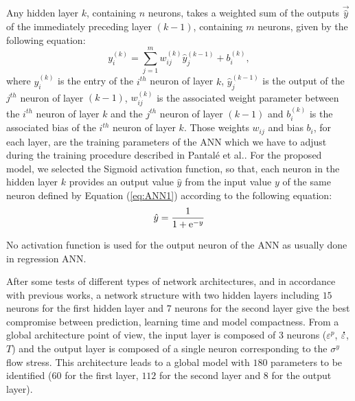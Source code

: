 \documentclass[twoside,english,1p,final,sort&compress]{elsarticle}
\makeatletter
\theoremstyle{plain}
\DeclareRobustCommand{\e}[1]{{\rm e}^{#1}}
\DeclareRobustCommand{\lay}[1]{^{(#1)}}
\DeclareRobustCommand{\mdot}[1]{\accentset{\mbox{\bfseries .}}{#1}}
\DeclareRobustCommand{\eal}{et al.\@\xspace}
\makeatother
\begin{document}
Any hidden layer $k$, containing $n$ neurons, takes a weighted sum of the outputs $\overrightarrow{\hat{y}}$ of the immediately preceding layer $(k-1)$, containing $m$ neurons, given by the following equation:
\begin{equation}
y_i\lay{k} = \sum_{j=1}^m w_{ij}\lay{k} \hat{y}_j^{(k-1)}+ b_i\lay{k},\label{eq:ANN1}
\end{equation}
where $y_i\lay{k}$ is the entry of the $i^{th}$ neuron of layer $k$, $\hat{y}_j\lay{k-1}$ is the output of the $j^{th}$ neuron of layer $(k-1)$, $w_{ij}\lay{k}$ is the associated weight parameter between the $i^{th}$ neuron of layer $k$ and the $j^{th}$ neuron of layer $(k-1)$ and $b_i\lay{k}$ is the associated bias of the $i^{th}$ neuron of layer $k$.
Those weights $w_{ij}$ and bias $b_i$, for each layer, are the training parameters of the ANN which we have to adjust during the training procedure described in Pantalé \eal \cite{Pantale-2021, Pantale-2023}.
For the proposed model, we selected the Sigmoid activation function, so that, each neuron in the hidden layer $k$ provides an output value ${\hat{y}}$ from the input value $y$ of the same neuron defined by Equation (\ref{eq:ANN1}) according to the following equation:
\begin{equation}
\hat{y}=\frac{1}{1 + \e{-y}}\label{eq:ANN2}
\end{equation}

No activation function is used for the output neuron of the ANN as usually done in regression ANN.

After some tests of different types of network architectures, and in accordance with previous works, a network structure with two hidden layers including $15$ neurons for the first hidden layer and $7$ neurons for the second layer give the best compromise between prediction, learning time and model compactness.
From a global architecture point of view, the input layer is composed of $3$ neurons ($\varepsilon^p$, $\mdot\varepsilon$, $T$) and the output layer is composed of a single neuron corresponding to the $\sigma^y$ flow stress.
This architecture leads to a global model with $180$ parameters to be identified ($60$ for the first layer, $112$ for the second layer and $8$ for the output layer).
\end{document}
